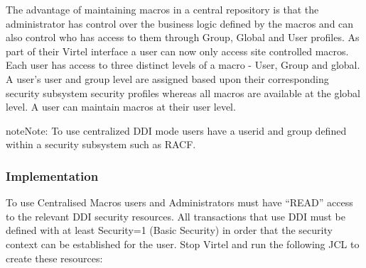 \documentclass[letterpaper,10pt,english]{sphinxmanual}
\begin{document}
The advantage of maintaining macros in a central repository is that the administrator has control over the business logic defined by the macros and can also control who has access to them through Group, Global and User profiles. As part of their Virtel interface a user can now only access site controlled macros. Each user has access to three distinct levels of a macro - User, Group and global. A user’s user and group level are assigned based upon their corresponding security subsystem security profiles whereas all macros are available at the global level. A user can maintain macros at their user level.

\begin{sphinxadmonition}{note}{Note:}
To use centralized DDI mode users have a userid and group defined within a security subsystem such as RACF.
\end{sphinxadmonition}

\ignorespaces 

\subsubsection{Implementation}
\label{\detokenize{Customization:implementation}}\label{\detokenize{Customization:index-86}}
To use Centralised Macros users and Administrators must have “READ” access to the relevant DDI security resources. All transactions that use DDI must be defined with at least Security=1 (Basic Security) in order that the security context can be established for the user.  Stop Virtel and run the following JCL to create these resources:
\end{document}
